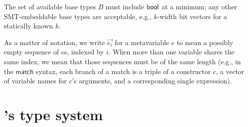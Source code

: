 \documentclass[acmsmall,screen,nonacm]{acmart}
\theoremstyle{definition}
\begin{document}
The set of available base types $B$ must include $\mathsf{bool}$ at a minimum;
any other SMT-embeddable base types are acceptable, e.g., $k$-width
bit vectors for a statically known $k$.

As a matter of notation, we write $\vec{e_i}$ for a metavariable $e$
to mean a possibly empty sequence of $e$s, indexed by $i$. When more
than one variable shares the same index, we mean that those sequences
must be of the same length (e.g., in the $\mathsf{match}$ syntax, each
branch of a match is a triple of a constructor $c$, a vector of
variable names for $c$'s arguments, and a corresponding single
expression).

\section{\Name's type system}
\label{sec:types}
\end{document}
